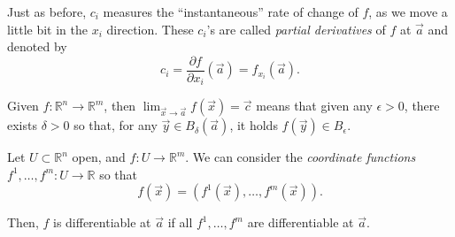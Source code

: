Just as before, $c_i$ measures the ``instantaneous'' rate of change of $f$, as we move a little bit in the $x_i$ direction. These $c_i$'s are called \emph{partial derivatives} of $f$ at $\vec a$ and denoted by \[
	c_i = \frac{\partial f}{\partial x_i}(\vec a) = f_{x_i}(\vec a).
\]

\begin{defn}
	Given $f: \mathbb{R}^n \to \mathbb{R}^m$, then $\lim_{\vec x \to \vec a}f(\vec x) = \vec c$ means that given any $\epsilon > 0$, there exists $\delta >  0$ so that, for any $\vec{y} \in B_\delta(\vec a)$, it holds $f(\vec y) \in B_\epsilon$.
\end{defn}

\begin{defn}
	Let $U \subset \mathbb{R}^n$ open, and $f: U \to \mathbb{R}^m$. We can consider the \emph{coordinate functions} $f^1, \dots, f^m: U \to \mathbb{R}$ so that \[
		f(\vec x) = (f^1(\vec x), \dots, f^m(\vec x)).
	\]

	Then, $f$ is differentiable at $\vec a$ if all $f^1, \dots, f^m$ are differentiable at $\vec a$.
\end{defn}
